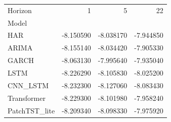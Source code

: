 \begin{tabular}{lrrr}
\toprule
Horizon & 1 & 5 & 22 \\
Model &  &  &  \\
\midrule
HAR & -8.150590 & -8.038170 & -7.944850 \\
ARIMA & -8.155140 & -8.034420 & -7.905330 \\
GARCH & -8.063130 & -7.995640 & -7.935040 \\
LSTM & -8.226290 & -8.105830 & -8.025200 \\
CNN_LSTM & -8.232300 & -8.127060 & -8.083430 \\
Transformer & -8.229300 & -8.101980 & -7.958240 \\
PatchTST_lite & -8.209340 & -8.098330 & -7.975920 \\
\bottomrule
\end{tabular}
